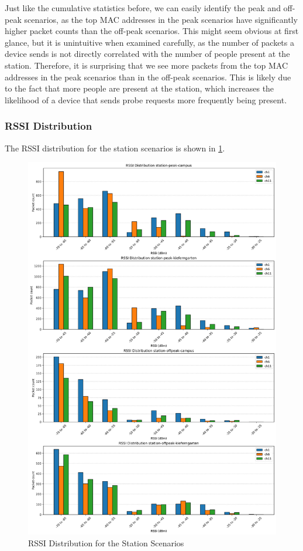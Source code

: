 \documentclass[sigconf,nonacm]{acmart}
\begin{document}
Just like the cumulative statistics before, we can easily identify the peak and off-peak scenarios, as the top MAC addresses in the peak scenarios have significantly higher packet counts than the off-peak scenarios. This might seem obvious at first glance, but it is unintuitive when examined carefully, as the number of packets a device sends is not directly correlated with the number of people present at the station. Therefore, it is surprising that we see more packets from the top MAC addresses in the peak scenarios than in the off-peak scenarios. This is likely due to the fact that more people are present at the station, which increases the likelihood of a device that sends probe requests more frequently being present.

\subsubsection{RSSI Distribution}
\label{sec:part-1/station/rssi-distribution}

The RSSI distribution for the station scenarios is shown in \cref{fig:station_rssi_distribution}.

\begin{figure}
    \centering
    \includegraphics[width=\columnwidth]{images/part1/rssi/station-scenarios.png}
    \caption{RSSI Distribution for the Station Scenarios}
    \label{fig:station_rssi_distribution}
\end{figure}
\end{document}
